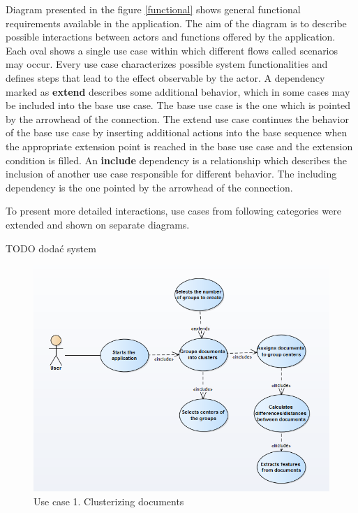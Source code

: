 Diagram presented in the figure \ref{functional} shows general functional requirements available in the application. The aim of the diagram is to describe possible interactions between actors and functions offered by the application. Each oval shows a single use case within which different flows called scenarios may occur. Every use case characterizes possible system functionalities and defines steps that lead to the effect observable by the actor. A dependency marked as \textbf{extend} describes some additional behavior, which in some cases may be included into the base use case. 
The base use case is the one which is pointed by the arrowhead of the connection. The extend use case continues the behavior of the base use case by inserting additional actions into the base sequence when the appropriate extension point is reached in the base use case and the extension condition is filled. An \textbf{include} dependency is a relationship which describes the inclusion of another use case responsible for different behavior. The including dependency is the one pointed by the arrowhead of the connection.


To present more detailed interactions, use cases from following categories were extended and shown on separate diagrams.

TODO dodać system
\begin{figure}[H]
	\begin{center}
		\includegraphics[width=1.0\linewidth]{images/diagrams/use-case/use-case-22.PNG}
		\caption{Use case 1. Clusterizing documents}
		\label{design-use-case-1}
	\end{center}
\end{figure}

